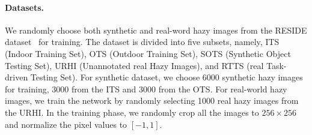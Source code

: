 \documentclass[10pt,twocolumn,letterpaper]{article}
\begin{document}
\paragraph{Datasets.}
We randomly choose both synthetic and real-word hazy images from the RESIDE dataset~\cite{li2019benchmarking} for training.
The dataset is divided into five subsets, namely, ITS (Indoor Training Set), OTS (Outdoor Training Set), SOTS (Synthetic Object Testing Set), URHI (Unannotated real Hazy Images), and RTTS (real Task-driven Testing Set).
For synthetic dataset, we choose 6000 synthetic hazy images for training, 3000 from the ITS and 3000 from the OTS.
For real-world hazy images, we train the network by randomly selecting 1000 real hazy images from the URHI.
In the training phase, we randomly crop all the images to $256\times256$ and normalize the pixel values to $\left [ -1, 1 \right ]$.
\vspace{-4mm}
\end{document}
